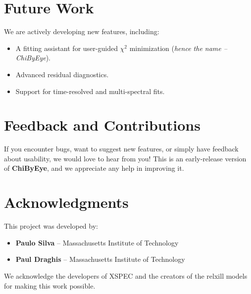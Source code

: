 \documentclass[11pt]{article}
\begin{document}
\section*{Future Work}

We are actively developing new features, including:
\begin{itemize}
    \item A fitting assistant for user-guided $\chi^2$ minimization (\textit{hence the name -- ChiByEye}).
    \item Advanced residual diagnostics.
    \item Support for time-resolved and multi-spectral fits.
\end{itemize}

\section*{Feedback and Contributions}

If you encounter bugs, want to suggest new features, or simply have feedback about usability, we would love to hear from you!  
This is an early-release version of \textbf{ChiByEye}, and we appreciate any help in improving it.

\section*{Acknowledgments}

This project was developed by:

\begin{itemize}
    \item \textbf{Paulo Silva} – Massachusetts Institute of Technology
    \item \textbf{Paul Draghis} – Massachusetts Institute of Technology
\end{itemize}

\bigskip

\noindent We acknowledge the developers of XSPEC and the creators of the relxill models for making this work possible.
\end{document}
